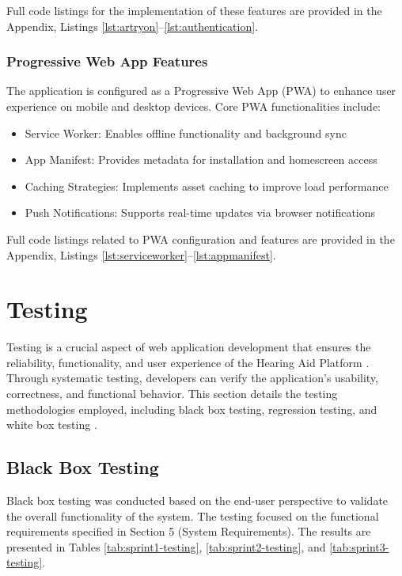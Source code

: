 \documentclass{article}
\begin{document}
Full code listings for the implementation of these features are provided in the Appendix, Listings \ref{lst:artryon}--\ref{lst:authentication}.

\subsubsection{Progressive Web App Features}
The application is configured as a Progressive Web App (PWA) to enhance user experience on mobile and desktop devices. Core PWA functionalities include:

\begin{itemize} 
    \item Service Worker: Enables offline functionality and background sync 
    \item App Manifest: Provides metadata for installation and homescreen access 
    \item Caching Strategies: Implements asset caching to improve load performance 
    \item Push Notifications: Supports real-time updates via browser notifications 
\end{itemize}

Full code listings related to PWA configuration and features are provided in the Appendix, Listings \ref{lst:serviceworker}--\ref{lst:appmanifest}.

\newpage


\fancyhead[L]{} 

\section{Testing}
Testing is a crucial aspect of web application development that ensures the reliability, functionality, and user experience of the Hearing Aid Platform \cite{geeksforgeeks_web_testing_2024}. Through systematic testing, developers can verify the application's usability, correctness, and functional behavior. This section details the testing methodologies employed, including black box testing, regression testing, and white box testing \cite{nidhra_black_2012}.

\subsection{Black Box Testing}
Black box testing was conducted based on the end-user perspective to validate the overall functionality of the system. The testing focused on the functional requirements specified in Section 5 (System Requirements). The results are presented in Tables \ref{tab:sprint1-testing}, \ref{tab:sprint2-testing}, and \ref{tab:sprint3-testing}.
\end{document}
